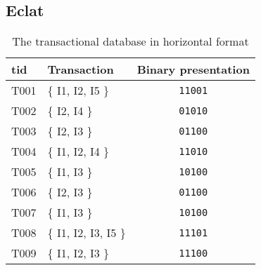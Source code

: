 



\subsection{Eclat}
\label{sub:eclat}
\begin{table}[]
    \centering
    \begin{tabular}{|l|l|c|}
        \hline
        \textbf{tid} & \textbf{Transaction}   & \textbf{Binary presentation} \\ \hline
        T001         & \{ I1, I2, I5 \}       & \texttt{11001}               \\ \hline
        T002         & \{ I2, I4 \}           & \texttt{01010}               \\ \hline
        T003         & \{ I2, I3 \}           & \texttt{01100}               \\ \hline
        T004         & \{ I1, I2, I4 \}       & \texttt{11010}               \\ \hline
        T005         & \{ I1, I3 \}           & \texttt{10100}               \\ \hline
        T006         & \{ I2, I3 \}           & \texttt{01100}               \\ \hline
        T007         & \{ I1, I3 \}           & \texttt{10100}               \\ \hline
        T008         & \{ I1, I2, I3, I5 \}   & \texttt{11101}               \\ \hline
        T009         & \{ I1, I2, I3 \}       & \texttt{11100}               \\ \hline
    \end{tabular}
    \caption{The transactional database in horizontal format \citep{han2012mining}}
    \label{tab:horizontal-transactional-database}
\end{table}

